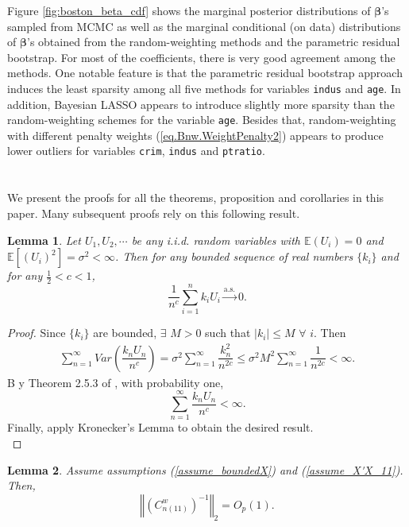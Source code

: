\documentclass[ejs,authoryear,linksfromyear]{imsart}
\newcommand{\sumin}{\sum_{i=1}^n} %
\newcommand{\CONV}[1]{\stackrel{\text{#1}}{\longrightarrow}} %
\newcommand{\cnwa}{C_{n(11)}^w}
\numberwithin{equation}{section}
\theoremstyle{plain}
\newtheorem{lem}{Lemma}[section]
\begin{document}
Figure \ref{fig:boston_beta_cdf} shows the marginal posterior distributions of $\bm{\beta}$'s sampled from MCMC as well as the marginal conditional (on data) distributions of $\bm{\beta}$'s obtained from the random-weighting methods and the parametric residual bootstrap. For most of the coefficients, there is very good agreement among the methods. One notable feature is that the parametric residual bootstrap approach induces the least sparsity among all five methods for variables \texttt{indus} and \texttt{age}. In addition, Bayesian LASSO appears to introduce slightly more sparsity than the random-weighting schemes for the variable \texttt{age}. Besides that, random-weighting with different penalty weights (\ref{eq.Bnw.WeightPenalty2}) appears to produce lower outliers for variables \texttt{crim}, \texttt{indus} and \texttt{ptratio}.\appendix

\section{} \label{sec_Appendix}

We present the proofs for all the theorems, proposition and corollaries in this paper. Many subsequent proofs rely on this following result.

\allowdisplaybreaks

\begin{lem} \label{lem_ASconv}
	Let $U_1, U_2, \cdots$ be any i.i.d. random variables with $\mathbb{E} (U_i) = 0$ and $\mathbb{E} [(U_i)^2] = \sigma^2 < \infty$. Then for any bounded sequence of real numbers $\{k_i\}$ and for any $\frac{1}{2} < c < 1$, 
	$$
	\dfrac{1}{n^c}
	\sumin k_i U_i \CONV{a.s.} 0.
	$$ 
\end{lem}

\begin{proof}
	Since $\{k_i\}$ are bounded, $\exists$ $M>0$ such that $|k_i| \leq M$ $\forall$ $i$. Then
	\begin{align*}
	\sum_{n=1}^{\infty} Var
	\left( \dfrac{k_n U_n}{n^c} \right)
	= \sigma^2 \sum_{n=1}^{\infty} \dfrac{k_n^2}{n^{2c}} 
	\leq \sigma^2 M^2 \sum_{n=1}^{\infty} \dfrac{1}{n^{2c}} 
	< \infty.
	\end{align*} 
	B  y Theorem 2.5.3 of \citet{durrett}, with probability one,
	$$
	\sum_{n=1}^{\infty}  \dfrac{k_n U_n}{n^c} < \infty.
	$$
	Finally, apply Kronecker's Lemma to obtain the desired result. \\
\end{proof}

\begin{lem} \label{lem_Cnw11inv}
	Assume assumptions (\ref{assume_boundedX}) and (\ref{assume_X'X_11}). Then, 
	$$
	\left\Vert
	\left( \cnwa \right)^{-1} 
	\right\Vert_2
	= O_p(1).
	$$
\end{lem} 
\end{document}
